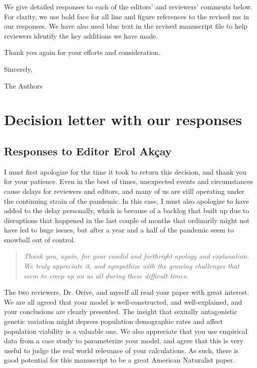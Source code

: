 \documentclass[11pt]{article}
\begin{document}
\noindent We give detailed responses to each of the editors' and reviewers' comments below. For clarity, we use bold face for all line and figure references to the revised ms in our responses. We have also used blue text in the revised manuscript file to help reviewers identify the key additions we have made.
\bigskip

\noindent Thank you again for your efforts and consideration.
\bigskip

\noindent Sincerely,

\noindent The Authors \\
\noindent\makebox[\linewidth]{\rule{\textwidth}{0.4pt}}
\smallskip


\section*{Decision letter with our responses}

\subsection*{Responses to Editor Erol Ak\c{c}ay}


I must first apologize for the time it took to return this decision, and thank you for your patience. Even in the best of times, unexpected events and circumstances cause delays for reviewers and editors, and many of us are still operating under the continuing strain of the pandemic. In this case, I must also apologize to have added to the delay personally, which is because of a backlog that built up due to disruptions that happened in the last couple of months that ordinarily might not have led to huge issues, but after a year and a half of the pandemic seem to snowball out of control.

\begin{quote}
	{\itshape Thank you, again, for your candid and forthright apology and explanation. We truly appreciate it, and sympathize with the growing challenges that seem to creep up on us all during these difficult times.}
\end{quote}


The two reviewers, Dr. Orive, and myself all read your paper with great interest. We are all agreed that your model is well-constructed, and well-explained, and your conclusions are clearly presented. The insight that sexually antagonistic genetic variation might depress population demographic rates and affect population viability is a valuable one. We also appreciate that you use empirical data from a case study to parameterize your model, and agree that this is very useful to judge the real world relevance of your calculations. As such, there is good potential for this manuscript to be a great American Naturalist paper.
\end{document}
